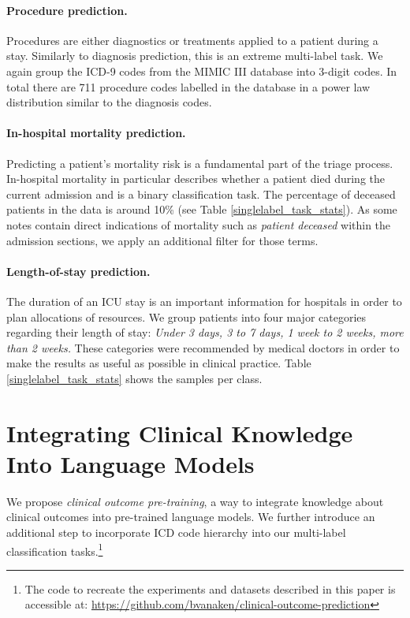 \documentclass[11pt,a4paper]{article}
\begin{document}
\paragraph{Procedure prediction.} Procedures are either diagnostics or treatments applied to a patient during a stay. Similarly to diagnosis prediction, this is an extreme multi-label task. We again group the ICD-9 codes from the MIMIC III database into 3-digit codes. In total there are 711 procedure codes labelled in the database in a power law distribution similar to the diagnosis codes.

\paragraph{In-hospital mortality prediction.} Predicting a patient's mortality risk is a fundamental part of the triage process. In-hospital mortality in particular describes whether a patient died during the current admission and is a binary classification task. The percentage of deceased patients in the data is around 10\% (see Table \ref{singlelabel_task_stats}). As some notes contain direct indications of mortality such as \textit{patient deceased} within the admission sections, we apply an additional filter for those terms.

\paragraph{Length-of-stay prediction.} The duration of an ICU stay is an important information for hospitals in order to plan allocations of resources. We group patients into four major categories regarding their length of stay: \textit{Under 3 days, 3 to 7 days, 1 week to 2 weeks, more than 2 weeks.} These categories were recommended by medical doctors in order to make the results as useful as possible in clinical practice. Table \ref{singlelabel_task_stats} shows the samples per class. \section{Integrating Clinical Knowledge Into Language Models}
We propose \textit{clinical outcome pre-training}, a way to integrate knowledge about clinical outcomes into pre-trained language models. We further introduce an additional step to incorporate ICD code hierarchy into our multi-label classification tasks.\footnote{The code to recreate the experiments and datasets described in this paper is accessible at: \url{https://github.com/bvanaken/clinical-outcome-prediction}}
\end{document}
